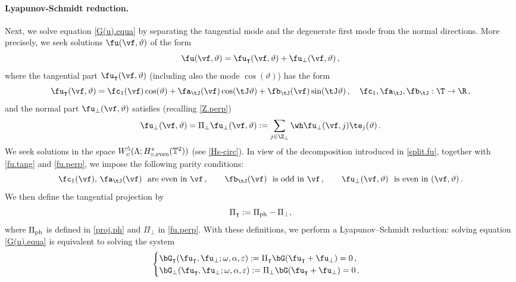 \documentclass[a4paper,reqno,10pt]{article}
\begin{document}
 \paragraph{Lyapunov-Schmidt reduction.}
Next, we solve equation \eqref{G(u).equa} by separating the tangential mode and the degenerate first mode from the normal directions. More precisely, we seek solutions \(\fu(\vf,\vartheta)\) of the form
\begin{equation}\label{split.fu}
	\fu(\vf,\vartheta) = \fu_{\intercal}(\vf,\vartheta) + \fu_{\perp}(\vf,\vartheta) \,,
\end{equation}
where the tangential part $\fu_{\intercal}(\vf,\vartheta)$ (including also the mode $\cos(\vartheta)$) has the form
\begin{equation}\label{fu.tang}
	\fu_{\intercal}(\vf,\vartheta) = \fc_{1}(\vf) \cos(\vartheta) + \fa_{\tJ}(\vf)\cos(\tJ\vartheta)+\fb_{\tJ}(\vf)\sin(\tJ\vartheta) \,, \quad \fc_{1}, \fa_{\tJ},\fb_{\tJ}:\T\to\R\,,
\end{equation}
and the normal part $\fu_{\perp}(\vf,\vartheta)$ satisfies (recalling \eqref{Z.perp})
\begin{equation}\label{fu.perp}
	\fu_{\perp}(\vf,\vartheta) = \Pi_{\perp} \fu_{\perp} (\vf,\vartheta):= \sum_{j\in\Z_{\perp}} \wh\fu_{\perp}(\vf,j) \te_{j}(\vartheta) \,.
\end{equation}
We seek solutions in the space 
\({W_\upsilon^5(\Lambda; H_{\circ,{\rm even}}^s(\mathbb{T}^2))}\)
(see \eqref{Hs-circ}). In view of the decomposition introduced in
\eqref{split.fu}, together with \eqref{fu.tang} and \eqref{fu.perp}, we impose
the following parity conditions:
\begin{equation}\label{parities.1}
\fc_{1}(\vf), \, \fa_{\tJ}(\vf)\ \text{ are even in } \vf\,,
\qquad
\fb_{\tJ}(\vf)\ \text{ is odd in } \vf\,,
\qquad
\fu_{\perp}(\vf,\vartheta)\ \text{ is even in } (\vf,\vartheta) \,.
\end{equation}
We then define the tangential projection by
$$
{\Pi_{\intercal}} := \Pi_{\rm ph} - \Pi_{\perp},
$$
where \(\Pi_{\rm ph}\) is defined in \eqref{proj.ph} and \(\Pi_{\perp}\) in
\eqref{fu.perp}. With these definitions, we perform a Lyapunov--Schmidt
reduction: solving equation \eqref{G(u).equa} is equivalent to solving the
system
\begin{equation}
\begin{cases}\label{LyaSch}
	\bG_{\intercal}(\fu_{\intercal},\fu_{\perp};\omega,\alpha,\varepsilon) := \Pi_{\intercal} \bG(\fu_{\intercal}+\fu_{\perp}) = 0\,, \\
	\bG_{\perp}(\fu_{\intercal},\fu_{\perp};\omega,\alpha,\varepsilon) := \Pi_{\perp} \bG(\fu_{\intercal}+\fu_{\perp}) = 0 \,.
\end{cases}
\end{equation}
\end{document}
